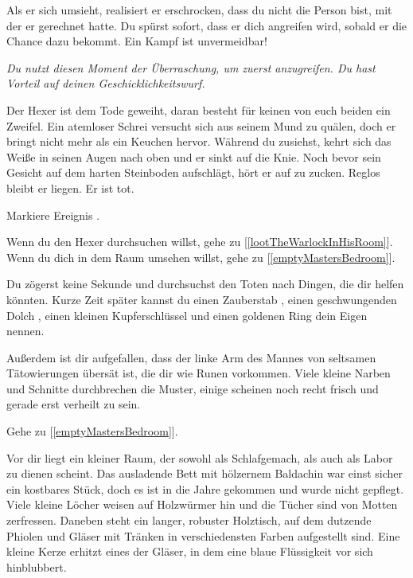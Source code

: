 Als er sich umsieht, realisiert er erschrocken, dass du nicht die Person bist, mit der er gerechnet hatte. Du spürst sofort, dass er dich angreifen wird, sobald er die Chance dazu bekommt. Ein Kampf ist unvermeidbar!

\textit{Du nutzt diesen Moment der Überraschung, um zuerst anzugreifen. Du hast Vorteil auf deinen Geschicklichkeitswurf.}



Der Hexer ist dem Tode geweiht, daran besteht für keinen von euch beiden ein Zweifel. Ein atemloser Schrei versucht sich aus seinem Mund zu quälen, doch er bringt nicht mehr als ein Keuchen hervor. Während du zusiehst, kehrt sich das Weiße in seinen Augen nach oben und er sinkt auf die Knie. Noch bevor sein Gesicht auf dem harten Steinboden aufschlägt, hört er auf zu zucken. Reglos bleibt er liegen. Er ist tot.

Markiere Ereignis .

Wenn du den Hexer durchsuchen willst, gehe zu [\ref{lootTheWarlockInHisRoom}].
Wenn du dich in dem Raum umsehen willst, gehe zu [\ref{emptyMastersBedroom}].


Du zögerst keine Sekunde und durchsuchst den Toten nach Dingen, die dir helfen könnten.
Kurze Zeit später kannst du einen Zauberstab , einen geschwungenden Dolch , einen kleinen Kupferschlüssel  und einen goldenen Ring  dein Eigen nennen.

Außerdem ist dir aufgefallen, dass der linke Arm des Mannes von seltsamen Tätowierungen übersät ist, die dir wie Runen vorkommen. Viele kleine Narben und Schnitte durchbrechen die Muster, einige scheinen noch recht frisch und gerade erst verheilt zu sein.

Gehe zu [\ref{emptyMastersBedroom}].


Vor dir liegt ein kleiner Raum, der sowohl als Schlafgemach, als auch als Labor zu dienen scheint.
Das ausladende Bett mit hölzernem Baldachin war einst sicher ein kostbares Stück, doch es ist in die Jahre gekommen und wurde nicht gepflegt. Viele kleine Löcher weisen auf Holzwürmer hin und die Tücher sind von Motten zerfressen. Daneben steht ein langer, robuster Holztisch, auf dem dutzende Phiolen und Gläser mit Tränken in verschiedensten Farben aufgestellt sind. Eine kleine Kerze erhitzt eines der Gläser, in dem eine blaue Flüssigkeit vor sich hinblubbert.

